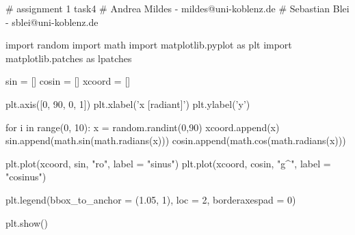 \documentclass{WeSTassignment}
\begin{document}
# assignment 1 task4
# Andrea Mildes - mildes@uni-koblenz.de
# Sebastian Blei - sblei@uni-koblenz.de


import random
import math
import matplotlib.pyplot as plt
import matplotlib.patches as lpatches

sin = []
cosin = []
xcoord = []

plt.axis([0, 90, 0, 1])
plt.xlabel('x [radiant]')
plt.ylabel('y')

for i in range(0, 10):
    x = random.randint(0,90)
    xcoord.append(x)
    sin.append(math.sin(math.radians(x)))
    cosin.append(math.cos(math.radians(x))) 

plt.plot(xcoord, sin, "ro",  label = "sinus")
plt.plot(xcoord, cosin, "g^", label = "cosinus")

plt.legend(bbox_to_anchor = (1.05, 1), loc = 2, borderaxespad = 0)

plt.show()



\makefooter
\end{document}
